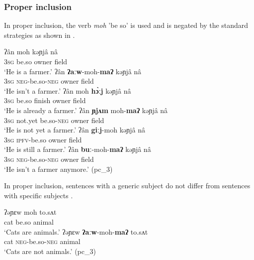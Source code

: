 \documentclass[output=paper,colorlinks,citecolor=brown]{langscibook}
\begin{document}
\subsubsection{Proper inclusion} \label{sec:rum:2.3.2}

In proper inclusion, the verb \textit{moh} 'be so' is used and is negated by the standard strategies as shown in .

\ea\label{ex:rum:36}
    \ea\label{ex:rum:36a}
        \gll ʔân	moh	kəɲjâ	nâ \\ 
             3\textsc{sg} be.so owner field \\
        \glt  ‘He is a farmer.’
    \ex\label{ex:rum:36b}
        \gll ʔân	\textbf{ʔaːw}-moh-\textbf{maʔ}	kəɲjâ	nâ \\
             3\textsc{sg} \textsc{neg}{}-be.so-\textsc{neg} owner field \\
        \glt ‘He isn’t a farmer.’
    \ex\label{ex:rum:36c}
        \gll ʔân	moh	\textbf{hɔ̀ːj}	kəɲjâ	nâ \\
             3\textsc{sg} be.so finish owner field \\
        \glt ‘He is already a farmer.’
    \ex\label{ex:rum:36d}
        \gll ʔân	\textbf{ɲjʌm}	moh-\textbf{maʔ}	kəɲjâ	nâ \\
             3\textsc{sg} not.yet be.so-\textsc{neg} owner field \\
        \glt ‘He is not yet a farmer.’
    \ex\label{ex:rum:36e}
        \gll ʔân	\textbf{giːj}-moh	kəɲjâ	nâ \\
             3\textsc{sg} \textsc{ipfv}{}-be.so owner field \\
        \glt ‘He is still a farmer.’
    \ex\label{ex:rum:36f}
        \gll ʔân	\textbf{buː}-moh-\textbf{maʔ}	kəɲjâ	nâ \\
              3\textsc{sg} \textsc{neg}{}-be.so-\textsc{neg} owner field \\
        \glt  ‘He isn’t a farmer anymore.’ (pc\_3)
    \z
\z 

In proper inclusion, sentences with a generic subject  do not differ from sentences with specific subjects .

\ea\label{ex:rum:37}
    \ea\label{ex:rum:37a}
        \gll ʔəɲɛw	moh	to.sʌt \\ 
             cat be.so animal \\
        \glt  ‘Cats are animals.’
    \ex\label{ex:rum:37b}
        \gll ʔəɲɛw	\textbf{ʔaːw}-moh-\textbf{maʔ}	to.sʌt \\
             cat \textsc{neg}{}-be.so-\textsc{neg} animal \\
        \glt ‘Cats are not animals.’ (pc\_3)
    \z
\z 
\end{document}
